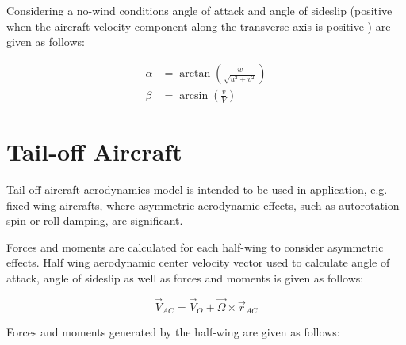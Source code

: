 Considering a no-wind conditions angle of attack and angle of sideslip (positive when the aircraft velocity component along the transverse axis is positive \cite{ISO-1151-1-1988}) are given as follows:

\begin{align}
  \alpha &= \arctan \left( \frac{w}{ \sqrt{ u^2 + v^2 } } \right) \\
  \beta  &= \arcsin \left( \frac{v}{V} \right)
\end{align}

\section{Tail-off Aircraft}

Tail-off aircraft aerodynamics model is intended to be used in application, e.g. fixed-wing aircrafts, where asymmetric aerodynamic effects, such as autorotation spin or roll damping, are significant.

Forces and moments are calculated for each half-wing to consider asymmetric effects. Half wing aerodynamic center velocity vector used to calculate angle of attack, angle of sideslip as well as forces and moments is given as follows:

\begin{equation}
  {\vec V}_{AC} = {\vec V}_O + {\vec \Omega} \times {\vec r}_{AC}
\end{equation}

Forces and moments generated by the half-wing are given as follows: \cite{StevensLewis1992}
